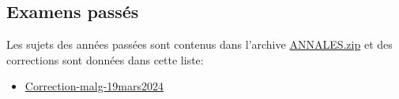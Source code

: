 \documentclass[ 12pt]{article}
\begin{document}
\subsection{Examens passés}
\label{sec:examens-passes}

Les sujets des années passées sont   contenus dans l'archive
\href{http://mery54.github.io/teaching/movex/lecturesnotes/ANNALES.zip}{ANNALES.zip}
et      des corrections sont données   dans cette liste:

\begin{itemize}
\item  \href{http://mery54.github.io/teaching/movex/lecturesnotes/Correction-malg-19mars2024.pdf}{Correction-malg-19mars2024}
\end{itemize}






 

\end{document}
